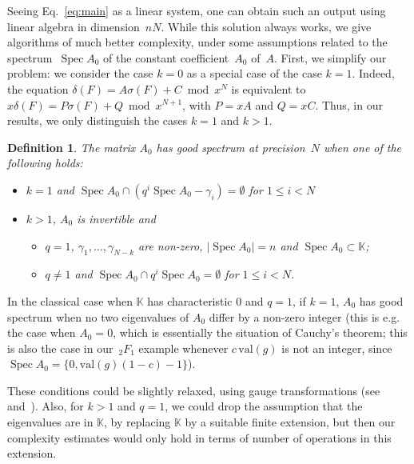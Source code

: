 \documentclass[]{sig-alternate}
\def\val {\ensuremath{\mathrm{val}}}
\def\partial{\delta}
\def\Spec{\operatorname{Spec}}
\def\K {\ensuremath{\mathbb{K}}}
\def\mA {\ensuremath{{A}}}
\def\mC {\ensuremath{{C}}}
\def\mF {\ensuremath{{F}}}
\newtheorem{Def}{Definition}
\begin{document}
Seeing Eq.~\eqref{eq:main} as a linear system, one can obtain such an
output using linear algebra in dimension~$nN$. While this solution
always works, we  give algorithms of much better complexity, under
some assumptions related to the spectrum~$\Spec A_0$
of the constant coefficient~$\mA_0$ of~$\mA$. First, we simplify our problem: we 
consider the case $k=0$ as a special case of the case $k=1$. Indeed,
the equation $\partial(\mF) = \mA \sigma(\mF) + \mC \bmod x^N$ is
equivalent to $x\partial(\mF) = P \sigma(\mF) +Q \bmod x^{N+1}$, with
$P=x\mA$ and $Q=x\mC$. Thus, in our results, we only distinguish the
cases $k=1$ and $k>1$.

\begin{Def} The matrix $A_0$ has \emph{good spectrum at precision~$N$} 
when one of the following holds:
\begin{itemize}
\item $k=1$ and $\Spec A_0\cap(q^i\Spec A_0-\gamma_i)=\emptyset$ for $1\le i < N$
\item $k>1$, $A_0$ is invertible and
  \begin{itemize}\setlength{\itemindent}{-10pt}
  \item $q=1$, $\gamma_1,\dots,\gamma_{N-k}$ are non-zero, $|\Spec
    A_0|=n$ and $\Spec A_0\subset\K$;
  \item $q\ne 1$ and $\Spec A_0\cap q^i\Spec A_0=\emptyset$ for $1\le i<N$.
  \end{itemize}
\end{itemize}
\end{Def}
In the classical case when $\K$ has characteristic 0 and $q=1$, if
$k=1$, $A_0$ has good spectrum when no two eigenvalues of $A_0$ differ
by a non-zero integer (this is e.g. the case when $A_0=0$, which is
essentially the situation of Cauchy's theorem; this is also the case
in our~${}_2F_1$ example whenever $c\,\val(g)$ is not an integer,
since $\Spec A_0=\{0,\val(g)(1-c)-1\}$).

These conditions could be slightly relaxed, using gauge
transformations (see~\cite[Ch.~2]{Balser00}
and~\cite{BaBrPf10,BaPf99}).  Also, for $k>1$ and
$q=1$, we could drop the assumption that the eigenvalues are in $\K$,
by replacing $\K$ by a suitable finite extension, but then our
complexity estimates would only hold in terms of number of operations
in this extension.

\smallskip
\end{document}

